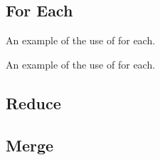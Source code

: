\subsection{For Each}

\raggedbottom
\begin{codebox}[]{\href{https://godbolt.org/z/}{\ExternalLink}}
\footnotesize An example of the use of for each.
\tcblower
{}
\end{codebox}

\raggedbottom
\begin{codebox}[]{\href{https://godbolt.org/z/}{\ExternalLink}}
\footnotesize An example of the use of for each.
\tcblower
{}
\end{codebox}

\subsection{Reduce}

\subsection{Merge}

